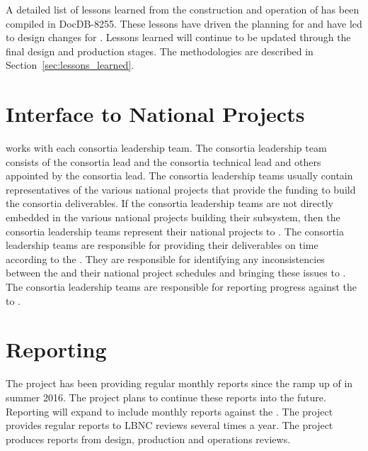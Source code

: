 A detailed list of lessons learned from the construction and operation
of  has been compiled in DocDB-8255. These lessons have
driven the planning for  and have led to design changes for
. Lessons learned will continue to be updated through the final
design and production stages. The methodologies are described in
Section~\ref{sec:lessons_learned}.

\section{Interface to National Projects}
\label{sec:fdsp-coord-national}

  works with each consortia leadership team. The
consortia leadership team consists of the consortia lead and the
consortia technical lead and others appointed by the consortia
lead. The consortia leadership teams usually contain representatives
of the various national projects that provide the funding to build the consortia
deliverables. If the consortia leadership teams are not directly
embedded in the various national projects building their subsystem,
then the consortia leadership teams represent their national projects
to . The consortia leadership teams are responsible for
providing their deliverables on time according to the
. They are responsible for identifying any inconsistencies
between the  and their national project schedules and
bringing these issues to . The consortia leadership teams
are responsible for reporting progress against the  to
.

\section{Reporting}
\label{sec:fdsp-coord-reporting}

The  project has been providing regular monthly reports
since the ramp up of  in summer 2016. The project plans to
continue these reports into the future. Reporting will expand to
include monthly reports against the . The 
project provides regular reports to LBNC reviews several times a
year. The  project produces reports from design,
production and operations reviews.



